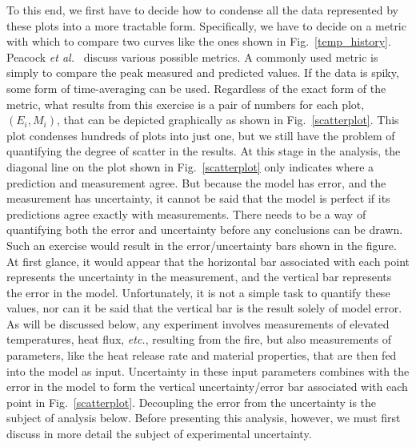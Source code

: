 To this end, we first have to decide how to condense all the data represented by these plots into a more tractable form. Specifically, we
have to decide on a metric with which to compare two curves like the ones shown in Fig.~\ref{temp_history}. Peacock {\em et al.}~\cite{Peacock:FSJ1999}
discuss various possible metrics. A commonly used metric is simply to compare the peak measured and predicted values.
If the data is spiky, some form of time-averaging can be used. Regardless of the exact form of the metric, what results from
this exercise is a pair of numbers for each plot, $(E_i,M_i)$, that can be depicted graphically as shown in Fig.~\ref{scatterplot}. This plot
condenses hundreds of plots into just one, but we still have the problem of quantifying the degree of scatter in the results. At this stage in the analysis, the
diagonal line on the plot shown in Fig.~\ref{scatterplot} only indicates where a prediction and measurement agree. But because the model has error, and
the measurement has uncertainty, it cannot be said that the model is perfect if its predictions agree exactly with measurements. There needs to be a way of quantifying
both the error and uncertainty before any conclusions can be drawn.
Such an exercise would result in the error/uncertainty bars shown in the figure. At first glance, it would appear that the
horizontal bar associated with each point represents the uncertainty in the measurement, and the vertical bar represents the error in the model. Unfortunately, it
is not a simple task to quantify these values, nor can it be said that the vertical bar is the result solely of model error. As will be discussed below, any
experiment involves measurements of elevated temperatures, heat flux, {\em etc.}, resulting from the fire, but also measurements of parameters, like the
heat release rate and material properties, that are then fed into the model as input. Uncertainty in these input parameters combines with the error in the model
to form the vertical uncertainty/error bar associated with each point in Fig.~\ref{scatterplot}. Decoupling the error from the uncertainty
is the subject of analysis below. Before presenting this
analysis, however, we must first discuss in more detail the subject of experimental uncertainty.

